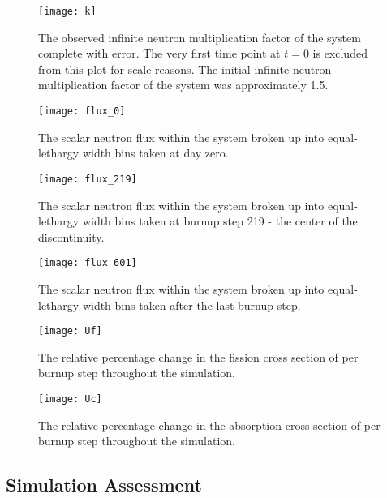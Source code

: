 \begin{figure}[H]
    \centering
    \texttt{[image: k]}
    \caption{The observed infinite neutron multiplication factor of the system
    complete with error. The very first time point at $t=0$ is excluded from
    this plot for scale reasons. The initial infinite neutron multiplication 
    factor of the system was approximately 1.5.}
    \label{fig:k}
\end{figure}

\begin{figure}[H]
    \centering
    \texttt{[image: flux\_0]}
    \caption{The scalar neutron flux within the system broken up into
    equal-lethargy width bins taken at day zero.}
    \label{fig:flux_0}
\end{figure}

\begin{figure}[H]
    \centering
    \texttt{[image: flux\_219]}
    \caption{The scalar neutron flux within the system broken up into
    equal-lethargy width bins taken at burnup step 219 - the center of the
    discontinuity.}
    \label{fig:flux_219}
\end{figure}

\begin{figure}[H]
    \centering
    \texttt{[image: flux\_601]}
    \caption{The scalar neutron flux within the system broken up into
    equal-lethargy width bins taken after the last burnup step.}
    \label{fig:flux_601}
\end{figure}

\begin{figure}[H]
    \centering
    \texttt{[image: Uf]}
    \caption{The relative percentage change in the fission cross section of
     per burnup step throughout the simulation.}
    \label{fig:uf}
\end{figure}

\begin{figure}[H]
    \centering
    \texttt{[image: Uc]}
    \caption{The relative percentage change in the absorption cross section of
     per burnup step throughout the simulation.}
    \label{fig:uf}
\end{figure}

\subsection{Simulation Assessment}\label{sec:disc}

